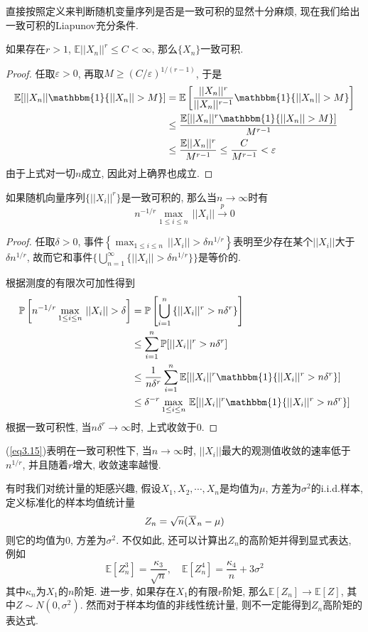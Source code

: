 \documentclass[cn, 12pt, math=mtpro2, bibstyle=apa, blue, twocol]{elegantbook}
\newcommand{\E}{\mathbb{E}}
\newcommand{\PP}{\mathbb{P}}
\newcommand{\overbar}[1]{\mkern 1.5mu\overline{\mkern-1.5mu#1\mkern-1.5mu}\mkern 1.5mu}
\begin{document}
直接按照定义来判断随机变量序列是否是一致可积的显然十分麻烦, 现在我们给出一致可积的Liapunov充分条件.
\begin{theorem}[Liapunov条件]
  如果存在$r>1$, $\E||X_n||^r\leq C<\infty$, 那么$\{X_n\}$一致可积.
\end{theorem}
\begin{proof}
  任取$\varepsilon>0$, 再取$M\geq(C/\varepsilon)^{1/(r-1)}$, 于是
  \begin{align*}
  \E[||X_n||\mathbbm{1}\{||X_n||>M\}]&=\E\left[\frac{||X_n||^r}{||X_n||^{r-1}}\mathbbm{1}\{||X_n||>M\}\right]\\
  &\leq\frac{\E[||X_n||^r\mathbbm{1}\{||X_n||>M\}]}{M^{r-1}}\\
  &\leq\frac{\E||X_n||^r}{M^{r-1}}\leq\frac{C}{M^{r-1}}<\varepsilon
  \end{align*}
  由于上式对一切$n$成立, 因此对上确界也成立.
\end{proof}
\begin{theorem}\label{thm:thm3.7}
  如果随机向量序列$\{||X_i||^r\}$是一致可积的, 那么当$n\to\infty$时有
  \begin{equation}\label{eq3.15}
    n^{-1/r}\max_{1\leq i\leq n}\,||X_i||\xrightarrow{p}0
  \end{equation}
\end{theorem}
\begin{proof}
  任取$\delta>0$, 事件$\displaystyle\left\{\max_{1\leq i\leq n}\,||X_i||>\delta n^{1/r}\right\}$表明至少存在某个$||X_i||$大于$\delta n^{1/r}$, 故而它和事件$\{\bigcup_{n=1}^\infty\{||X_i||>\delta n^{1/r}\}\}$是等价的.

  根据测度的有限次可加性得到
  \begin{align*}
  \PP\left[n^{-1/r}\max_{1\leq i\leq n}\,||X_i||>\delta\right]&=\PP\left[\bigcup_{i=1}^n\,\{||X_i||^r>n\delta^r\}\right] \\
  &\leq\sum_{i=1}^{n}\PP[||X_i||^r>n\delta^r] \\
  &\leq\frac{1}{n\delta^r}\sum_{i=1}^{n}\E[||X_i||^r\mathbbm{1}\{||X_i||^r>n\delta^r\}] \\
  &\leq\delta^{-r}\max_{1\leq i\leq n}\,\E[||X_i||^r\mathbbm{1}\{||X_i||^r>n\delta^r\}]
  \end{align*}
  根据一致可积性, 当$n\delta^r\to\infty$时, 上式收敛于0.
\end{proof}
(\ref{eq3.15})表明在一致可积性下, 当$n\to\infty$时, $||X_i||$最大的观测值收敛的速率低于$n^{1/r}$, 并且随着$r$增大, 收敛速率越慢.

有时我们对统计量的矩感兴趣, 假设$X_1,X_2,\cdots,X_n$是均值为$\mu$, 方差为$\sigma^2$的i.i.d.样本, 定义标准化的样本均值统计量
$$Z_n=\sqrt{n}(\overbar{X}_n-\mu)$$
则它的均值为0, 方差为$\sigma^2$. 不仅如此, 还可以计算出$Z_n$的高阶矩并得到显式表达, 例如
$$\E[Z_n^3]=\frac{\kappa_3}{\sqrt{n}},\quad \E[Z_n^4]=\frac{\kappa_4}{n}+3\sigma^2$$
其中$\kappa_n$为$X_1$的$n$阶矩. 进一步, 如果存在$X_1$的有限$r$阶矩, 那么$\E[Z_n]\to\E[Z]$, 其中$Z\sim N(0,\sigma^2)$. 然而对于样本均值的非线性统计量, 则不一定能得到$Z_n$高阶矩的表达式.
\end{document}
